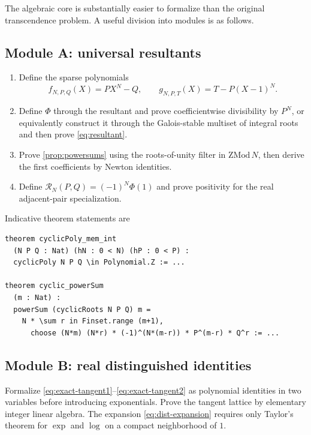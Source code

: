 \documentclass[11pt]{article}
\theoremstyle{definition}
\theoremstyle{remark}
\begin{document}
The algebraic core is substantially easier to formalize than the original transcendence problem.  A useful division into modules is as follows.

\subsection{Module A: universal resultants}
\begin{enumerate}
\item Define the sparse polynomials
\[
f_{N,P,Q}(X)=PX^N-Q,
\qquad g_{N,P,T}(X)=T-P(X-1)^N.
\]
\item Define \(\Phi\) through the resultant and prove coefficientwise divisibility by \(P^N\), or equivalently construct it through the Galois-stable multiset of integral roots and then prove \eqref{eq:resultant}.
\item Prove \cref{prop:powersums} using the roots-of-unity filter in \(\mathrm{ZMod}\,N\), then derive the first coefficients by Newton identities.
\item Define \(\mathscr R_N(P,Q)=(-1)^N\Phi(1)\) and prove positivity for the real adjacent-pair specialization.
\end{enumerate}

Indicative theorem statements are
\begin{lstlisting}[language={},basicstyle=\ttfamily\small,frame=single,breaklines=true]
theorem cyclicPoly_mem_int
  (N P Q : Nat) (hN : 0 < N) (hP : 0 < P) :
  cyclicPoly N P Q \in Polynomial.Z := ...

theorem cyclic_powerSum
  (m : Nat) :
  powerSum (cyclicRoots N P Q) m =
    N * \sum r in Finset.range (m+1),
      choose (N*m) (N*r) * (-1)^(N*(m-r)) * P^(m-r) * Q^r := ...
\end{lstlisting}

\subsection{Module B: real distinguished identities}
Formalize \eqref{eq:exact-tangent1}--\eqref{eq:exact-tangent2} as polynomial identities in two variables before introducing exponentials.  Prove the tangent lattice by elementary integer linear algebra.  The expansion \eqref{eq:dist-expansion} requires only Taylor's theorem for \(\exp\) and \(\log\) on a compact neighborhood of \(1\).
\end{document}
